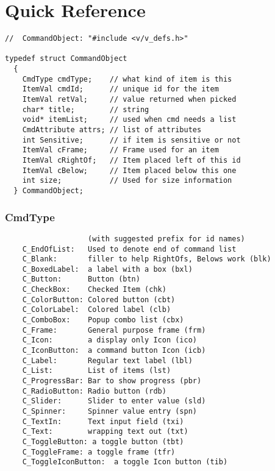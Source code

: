 
\chapter {Quick Reference}


\footnotesize
\begin{verbatim}
//  CommandObject: "#include <v/v_defs.h>"

typedef struct CommandObject
  {
    CmdType cmdType;    // what kind of item is this
    ItemVal cmdId;      // unique id for the item
    ItemVal retVal;     // value returned when picked
    char* title;        // string
    void* itemList;     // used when cmd needs a list
    CmdAttribute attrs; // list of attributes
    int Sensitive;      // if item is sensitive or not
    ItemVal cFrame;     // Frame used for an item
    ItemVal cRightOf;   // Item placed left of this id
    ItemVal cBelow;     // Item placed below this one
    int size;           // Used for size information
  } CommandObject;
\end{verbatim}
\normalfont\normalsize

\subsection*{CmdType}

\footnotesize
\begin{verbatim}
                   (with suggested prefix for id names)
    C_EndOfList:   Used to denote end of command list
    C_Blank:       filler to help RightOfs, Belows work (blk)
    C_BoxedLabel:  a label with a box (bxl)
    C_Button:      Button (btn)
    C_CheckBox:    Checked Item (chk)
    C_ColorButton: Colored button (cbt)
    C_ColorLabel:  Colored label (clb)
    C_ComboBox:    Popup combo list (cbx)
    C_Frame:       General purpose frame (frm)
    C_Icon:        a display only Icon (ico)
    C_IconButton:  a command button Icon (icb)
    C_Label:       Regular text label (lbl)
    C_List:        List of items (lst)
    C_ProgressBar: Bar to show progress (pbr)
    C_RadioButton: Radio button (rdb)
    C_Slider:      Slider to enter value (sld)
    C_Spinner:     Spinner value entry (spn)
    C_TextIn:      Text input field (txi)
    C_Text:        wrapping text out (txt)
    C_ToggleButton: a toggle button (tbt)
    C_ToggleFrame: a toggle frame (tfr)
    C_ToggleIconButton:  a toggle Icon button (tib)
\end{verbatim}
\normalfont\normalsize

